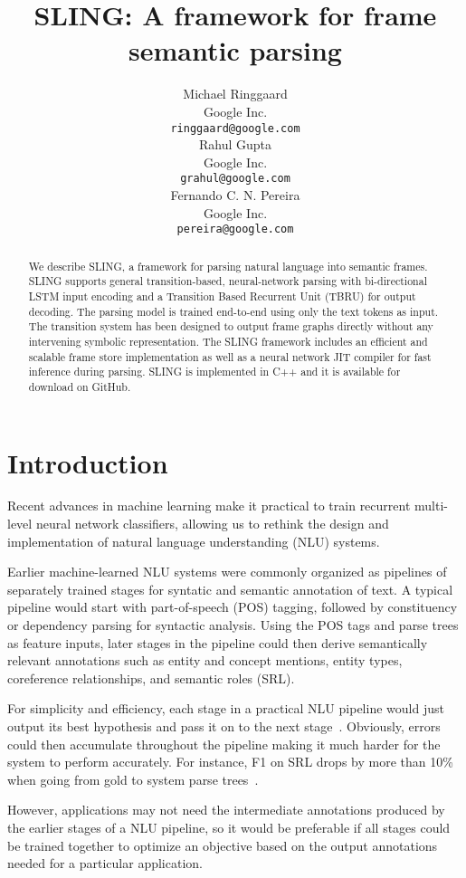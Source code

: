 \documentclass[11pt,a4paper]{article}
\title{SLING: A framework for frame semantic parsing}
\author{
Michael Ringgaard \\ Google Inc. \\ {\tt ringgaard@google.com} \\\And
Rahul Gupta \\ Google Inc. \\ {\tt grahul@google.com} \\\And
Fernando C. N. Pereira \\ Google Inc. \\ {\tt pereira@google.com} \\
}
\begin{document}
\maketitle

\begin{abstract}
We describe SLING, a framework for parsing natural language into
semantic frames. SLING supports general transition-based, neural-network parsing with
bi-directional LSTM input encoding and a Transition Based Recurrent
Unit (TBRU) for output decoding. The parsing model is
trained end-to-end using only the text tokens as input. The
transition system has been designed to output frame graphs directly without
any intervening symbolic representation.
The SLING framework includes an efficient and scalable frame store
implementation as well as a neural network JIT compiler for fast inference during parsing.
SLING is implemented in C++ and it is available for download on GitHub.
\end{abstract}

\section{Introduction}

Recent advances in machine learning make it practical to train
recurrent multi-level neural network classifiers, allowing us to rethink the
design and implementation of natural language
understanding (NLU) systems.

Earlier machine-learned NLU systems were commonly organized as pipelines of
separately trained stages for syntatic and semantic annotation of text.
A typical  pipeline would start with part-of-speech (POS) tagging, followed by
constituency or dependency parsing for syntactic analysis.
Using the POS tags and parse trees as feature inputs, later stages in the pipeline could then
derive semantically relevant annotations such as entity and concept mentions, entity types, coreference relationships,
and semantic roles (SRL).

For simplicity and efficiency, each stage in a practical NLU pipeline would just output its best hypothesis
and pass it on to the next stage~\cite{finkel2006}.
Obviously, errors could then accumulate
throughout the pipeline making it much harder for the system to perform
accurately. For instance, F1 on SRL drops by more than 10\% when going from gold to
system parse trees~\cite{toutanova2005}.

However, applications may not need the intermediate annotations produced
by the earlier stages of a NLU pipeline, so it would be preferable if all stages
could be trained together to optimize an objective based on the output
annotations needed for a particular application.
\end{document}
